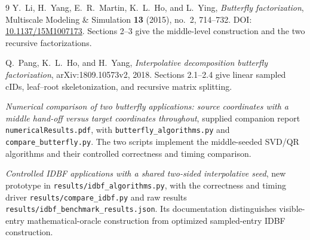 \documentclass[11pt]{article}
\begin{document}
\begin{thebibliography}{9}
Y.~Li, H.~Yang, E.~R.~Martin, K.~L.~Ho, and L.~Ying,
\emph{Butterfly factorization},
Multiscale Modeling \& Simulation \textbf{13} (2015), no.~2, 714--732.
DOI: \href{https://doi.org/10.1137/15M1007173}{10.1137/15M1007173}.
Sections 2--3 give the middle-level construction and the two recursive factorizations.

Q.~Pang, K.~L.~Ho, and H.~Yang,
\emph{Interpolative decomposition butterfly factorization},
arXiv:1809.10573v2, 2018.
Sections 2.1--2.4 give linear sampled cIDs, leaf--root skeletonization, and recursive matrix splitting.

\emph{Numerical comparison of two butterfly applications: source coordinates with a middle hand-off versus target coordinates throughout}, supplied companion report \texttt{numericalResults.pdf}, with \texttt{butterfly\_algorithms.py} and \texttt{compare\_butterfly.py}.
The two scripts implement the middle-seeded SVD/QR algorithms and their controlled correctness and timing comparison.

\emph{Controlled IDBF applications with a shared two-sided interpolative seed}, new prototype in \texttt{results/idbf\_algorithms.py}, with the correctness and timing driver \texttt{results/compare\_idbf.py} and raw results \texttt{results/idbf\_benchmark\_results.json}.  Its documentation distinguishes visible-entry mathematical-oracle construction from optimized sampled-entry IDBF construction.
\end{thebibliography}
\end{document}
